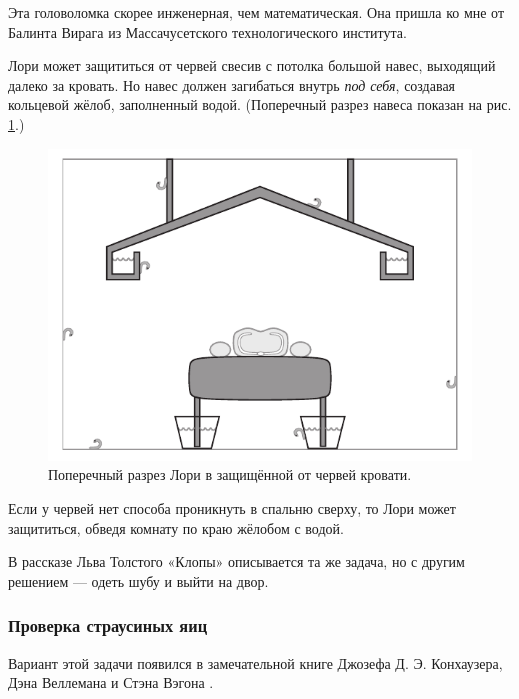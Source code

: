 Эта головоломка скорее инженерная, чем математическая.
Она пришла ко мне от Балинта Вирага из Массачусетского технологического института.

Лори может защититься от червей свесив с потолка большой навес, выходящий далеко за кровать.
Но навес должен загибаться внутрь \emph{под себя}, создавая кольцевой жёлоб, заполненный водой.
(Поперечный разрез навеса показан на рис. \ref{pic:chervi}.)

\begin{figure}[h!]
\centering
\includegraphics[scale=0.5]{pics/chervi}
\caption{Поперечный разрез Лори в защищённой от червей кровати.}
\label{pic:chervi}
\end{figure}

Если у червей нет способа проникнуть в спальню сверху, то Лори может защититься, обведя комнату по краю жёлобом с водой.

\begin{addedbytheeditors}
В рассказе Льва Толстого «Клопы» описывается та же задача, но с другим решением --- одеть шубу и выйти на двор.
\pr
\end{addedbytheeditors} 

\subsubsection*{Проверка страусиных яиц}

Вариант этой задачи появился в замечательной книге Джозефа Д. Э. Конхаузера, Дэна Веллемана и Стэна Вэгона \cite{42}.

